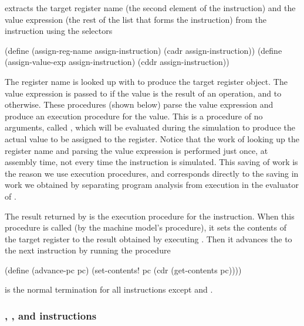 \noindent
{} extracts the target register name (the second element of the
instruction) and the value expression (the rest of the list that forms the
instruction) from the  instruction using the selectors

\begin{codeBlock}
(define (assign-reg-name assign-instruction)
  (cadr assign-instruction))
(define (assign-value-exp assign-instruction)
  (cddr assign-instruction))
\end{codeBlock}

\noindent
The register name is looked up with  to produce the target
register object.  The value expression is passed to 
if the value is the result of an operation, and to 
otherwise.  These procedures (shown below) parse the value expression and
produce an execution procedure for the value.  This is a procedure of no
arguments, called , which will be evaluated during the
simulation to produce the actual value to be assigned to the register.  Notice
that the work of looking up the register name and parsing the value expression
is performed just once, at assembly time, not every time the instruction is
simulated.  This saving of work is the reason we use execution procedures, and
corresponds directly to the saving in work we obtained by separating program
analysis from execution in the evaluator of .

The result returned by  is the execution procedure for the
 instruction.  When this procedure is called (by the machine
model's  procedure), it sets the contents of the target register
to the result obtained by executing .  Then it advances the
 to the next instruction by running the procedure

\begin{codeBlock}
(define (advance-pc pc)
  (set-contents! pc (cdr (get-contents pc))))
\end{codeBlock}

\noindent
{} is the normal termination for all instructions except
 and .

\subsubsection*{, , and  instructions}

